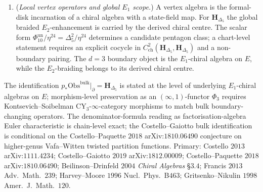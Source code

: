\begin{remark}
\begin{enumerate}[label=(\roman*),leftmargin=1.5em]
 \item (\emph{Local vertex operators and global \(E_1\) scope.}) A vertex algebra is the formal-disk incarnation of a chiral algebra with a state-field map.  For $\mathbf H_{\Delta_5}$ the global braided \(E_2\)-enhancement is carried by the derived chiral centre.  The scalar form $\Phi_{10}^{\mathrm{un}}/\eta^{24}=\Delta_5^2/\eta^{24}$ determines a candidate pentagon class; a chart-level statement requires an explicit cocycle in $C^2_{\mathrm{ch}}(\mathbf H_{\Delta_5},\mathbf H_{\Delta_5})$ and a non-boundary pairing.  The \(d=3\) boundary object is the \(E_1\)-chiral algebra on \(E\), while the \(E_2\)-braiding belongs to its derived chiral centre.
\end{enumerate}
The identification $p_\ast\mathrm{Obs}^{\mathrm{bulk}}|_\partial=\mathbf H_{\Delta_5}$ is stated at the level of underlying $E_1$-chiral algebras on $E$; morphism-level preservation as an $(\infty,1)$-functor $\Phi_3$ requires Kontsevich--Soibelman $\mathrm{CY}_3$-$\infty$-category morphisms to match bulk boundary-changing operators. The denominator-formula reading as factorisation-algebra Euler characteristic is chain-level exact; the Costello--Gaiotto bulk identification is conditional on the Costello--Paquette $2018$ arXiv:$1810.06490$ conjecture on higher-genus Vafa--Witten twisted partition functions. Primary: Costello $2013$ arXiv:$1111.4234$; Costello--Gaiotto $2019$ arXiv:$1812.00009$; Costello--Paquette $2018$ arXiv:$1810.06490$; Beilinson--Drinfeld $2004$ \emph{Chiral Algebras} \S$3.4$; Francis $2013$ Adv.\ Math.\ $239$; Harvey--Moore $1996$ Nucl.\ Phys.\ B$463$; Gritsenko--Nikulin $1998$ Amer.\ J.\ Math.\ $120$.
\end{remark}

